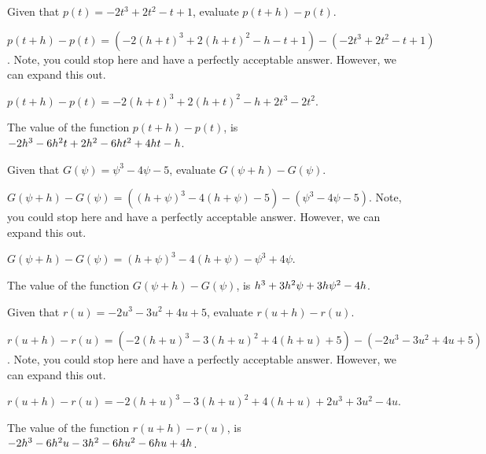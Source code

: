 \begin{shuffle} %
\begin{exercise}
Given that $p(t)=-2 t^3+2 t^2-t+1$, evaluate $p(t+h)-p(t)$.
\begin{solution}
\begin{hint}
$p(t+h)-p(t)=(-2 (h+t)^3+2 (h+t)^2-h-t+1)-(-2 t^3+2 t^2-t+1)$. Note, you could stop here and have a perfectly acceptable answer. However, we can expand this out.
\end{hint}
\begin{hint}
$p(t+h)-p(t)=-2 (h+t)^3+2 (h+t)^2-h+2 t^3-2 t^2$.
\end{hint}
The value of the function $p(t+h)-p(t)$, is ${-2 h^3-6 h^2 t+2 h^2-6 h t^2+4 h t-h}$.
\end{solution}
\end{exercise}

\begin{exercise}
Given that $G(\psi)=\psi ^3-4 \psi -5$, evaluate $G(\psi+h)-G(\psi)$.
\begin{solution}
\begin{hint}
$G(\psi+h)-G(\psi)=((h+\psi )^3-4 (h+\psi )-5)-(\psi ^3-4 \psi -5)$. Note, you could stop here and have a perfectly acceptable answer. However, we can expand this out.
\end{hint}
\begin{hint}
$G(\psi+h)-G(\psi)=(h+\psi )^3-4 (h+\psi )-\psi ^3+4 \psi$.
\end{hint}
The value of the function $G(\psi+h)-G(\psi)$, is ${h^3+3 h^2 \psi +3 h \psi ^2-4 h}$.
\end{solution}
\end{exercise}

\begin{exercise}
Given that $r(u)=-2 u^3-3 u^2+4 u+5$, evaluate $r(u+h)-r(u)$.
\begin{solution}
\begin{hint}
$r(u+h)-r(u)=(-2 (h+u)^3-3 (h+u)^2+4 (h+u)+5)-(-2 u^3-3 u^2+4 u+5)$. Note, you could stop here and have a perfectly acceptable answer. However, we can expand this out.
\end{hint}
\begin{hint}
$r(u+h)-r(u)=-2 (h+u)^3-3 (h+u)^2+4 (h+u)+2 u^3+3 u^2-4 u$.
\end{hint}
The value of the function $r(u+h)-r(u)$, is ${-2 h^3-6 h^2 u-3 h^2-6 h u^2-6 h u+4 h}$.
\end{solution}
\end{exercise}


\end{shuffle}
